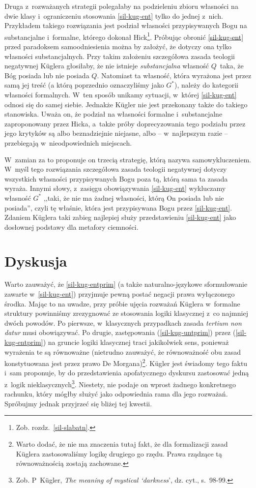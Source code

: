 Druga z~rozważanych strategii polegałaby na podzieleniu zbioru własności na dwie klasy i~ograniczeniu stosowania \ref{sil-kug-ent} tylko do jednej z~nich. Przykładem takiego rozwiązania jest podział własności przypisywanych Bogu na substancjalne i~formalne, którego dokonał Hick\footnote{Zob. rozdz.~\ref{sil-slabatn}.}. Próbując obronić \ref{sil-kug-ent} przed paradoksem samoodniesienia można by założyć, że dotyczy ona tylko własności substancjalnych. Przy takim założeniu szczegółowa zasada teologii negatywnej Küglera głosiłaby, że nie istnieje \textit{substancjalna} własność $Q$~taka, że Bóg posiada lub nie posiada $Q$. Natomiast ta własność, która wyrażona jest przez samą jej treść (a którą poprzednio oznaczyliśmy jako $G^*$), należy do kategorii własności formalnych. W~ten sposób unikamy sytuacji, w~której \ref{sil-kug-ent} odnosi się do samej siebie. Jednakże Kügler nie jest przekonany także do takiego stanowiska. Uważa on, że podział na własności formalne i~substancjalne zaproponowany przez Hicka, a~także próby doprecyzowania tego podziału przez jego krytyków są albo beznadziejnie niejasne, albo -- w~najlepszym razie -- przebiegają w~nieodpowiednich miejscach.

W~zamian za to proponuje on trzecią strategię, którą nazywa samowykluczeniem. W~myśl tego rozwiązania szczegółowa zasada teologii negatywnej dotyczy wszystkich własności przypisywanych Bogu poza tą, którą sama ta zasada wyraża. Innymi słowy, z~zasięgu obowiązywania \ref{sil-kug-ent} wykluczamy własność $G^*$ ,,taki, że nie ma żadnej własności, którą On posiada lub nie posiada'', czyli tę właśnie, która jest przypisywana Bogu przez \ref{sil-kug-ent}. Zdaniem Küglera taki zabieg najlepiej służy przedstawieniu \ref{sil-kug-ent} jako dosłownej podstawy dla metafory ciemności.


\section{Dyskusja}\label{sil-kug-dyskusja}

Warto zauważyć, że \ref{sil-kug-entprim} (a także naturalno-językowe sformułowanie zawarte w~\ref{sil-kug-ent}) przyjmuje pewną postać negacji prawa wyłączonego środka. Mając to na uwadze, przy próbie ujęcia rozważań Küglera w~formalne struktury powinniśmy zrezygnować ze stosowania logiki klasycznej z~co najmniej dwóch powodów. Po pierwsze, w~klasycznych przypadkach zasada \textit{tertium non datur} musi obowiązywać. Po drugie, zastępowania (\ref{sil-kug-untprim}) przez (\ref{sil-kug-entprim}) na gruncie logiki klasycznej traci jakikolwiek sens, ponieważ wyrażenia te są równoważne (nietrudno zauważyć, że równoważność obu zasad konstytuowana jest przez prawo De Morgana)\footnote{Warto dodać, że nie ma znaczenia tutaj fakt, że dla formalizacji zasad Küglera zastosowaliśmy logikę drugiego go rzędu. Prawa rządzące tą równoważnością zostają zachowane.}. Kügler jest świadomy tego faktu i~sam proponuje, by do przedstawienia apofatycznego dyskursu zastosować jedną z~logik nieklasycznych\footnote{Zob. P~Kügler, \textit{The meaning of mystical ‘darkness}', dz. cyt., s.~98-99.}. Niestety, nie podaje on wprost żadnego konkretnego rachunku, który mógłby służyć jako odpowiednia rama dla jego rozważań. Spróbujmy jednak przyjrzeć się bliżej tej kwestii.

